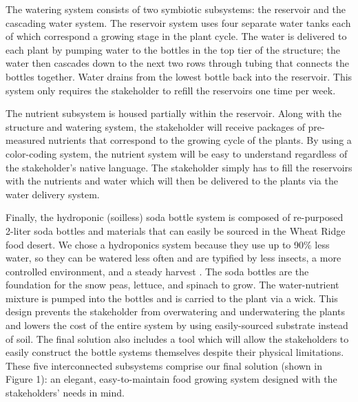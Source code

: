\documentclass[12pt]{article}
\begin{document}
{    The watering system consists of two symbiotic subsystems: the reservoir and the cascading water
    system. The reservoir system uses four separate water tanks each of which correspond a growing
    stage in the plant cycle. The water is delivered to each plant by pumping water to the bottles
    in the top tier of the structure; the water then cascades down to the next two rows through
    tubing that connects the bottles together. Water drains from the lowest bottle back into the
    reservoir. This system only requires the stakeholder to refill the reservoirs one time per week.

    The nutrient subsystem is housed partially within the reservoir. Along with the structure and
    watering system, the stakeholder will receive packages of pre-measured nutrients that correspond
    to the growing cycle of the plants. By using a color-coding system, the nutrient system will be
    easy to understand regardless of the stakeholder’s native language. The stakeholder simply has
    to fill the reservoirs with the nutrients and water which will then be delivered to the plants
    via the water delivery system.

    Finally, the hydroponic (soilless) soda bottle system is composed of re-purposed 2-liter soda
    bottles and materials that can easily be sourced in the Wheat Ridge food desert. We chose a
    hydroponics system because they use up to 90\% less water, so they can be watered less often and
    are typified by less insects, a more controlled environment, and a steady harvest
    \cite{j-camas}. The soda bottles are the foundation for the snow peas, lettuce, and spinach to
    grow. The water-nutrient mixture is pumped into the bottles and is carried to the plant via a
    wick. This design prevents the stakeholder from overwatering and underwatering the plants and
    lowers the cost of the entire system by using easily-sourced substrate instead of soil.  The
    final solution also includes a tool which will allow the stakeholders to easily construct the
    bottle systems themselves despite their physical limitations. These five interconnected
    subsystems comprise our final solution (shown in Figure 1): an elegant, easy-to-maintain food
    growing system designed with the stakeholders’ needs in mind.

}
\end{document}
